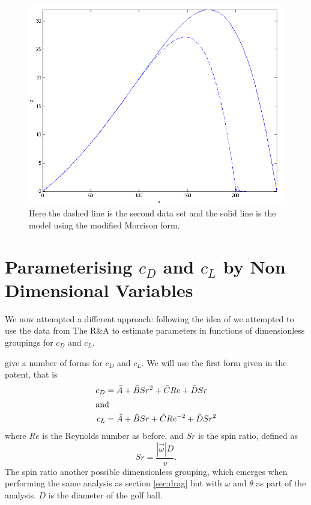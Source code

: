 \begin{figure}
\centering
\includegraphics[scale=0.8]{../images/data2-2d.png}
\caption[Second data set using the modified Morrison form.]{Here the dashed line is the second data
set and the solid line is the model using the modified Morrison form.}
\label{data2-2d}
\end{figure}

\section{Parameterising $c_{D}$ and $c_{L}$ by Non Dimensional Variables}

We now attempted a different approach: following the idea of \citet{Lieberman2001} we attempted to
use the data from The R\&A to estimate parameters in functions of dimensionless groupings for $c_D$
and $c_L$. 

\citet{Lieberman2001} give a number of forms for $c_D$ and $c_L$. We will use the first form given in
the patent, that is
\begin{subequations}
\begin{align}
c_D &= \bar{A} + \bar{B} Sr^2 + \bar{C} Re + \bar{D} Sr \\
\shortintertext{and}
c_L &= \hat{A} + \hat{B} Sr + \hat{C} Re^{-2} + \hat{D} Sr^2
\end{align}
\end{subequations}
where $Re$ is the Reynolds number as before, and $Sr$ is the spin ratio, defined as
\[
Sr = \frac{|\vec{\omega}|D}{v} .
\]
The spin ratio another possible dimensionless grouping, which emerges when performing the same analysis
as section \ref{sec:drag} but with $\omega$ and $\theta$ as part of the analysis. $D$ is the diameter
of the golf ball.

